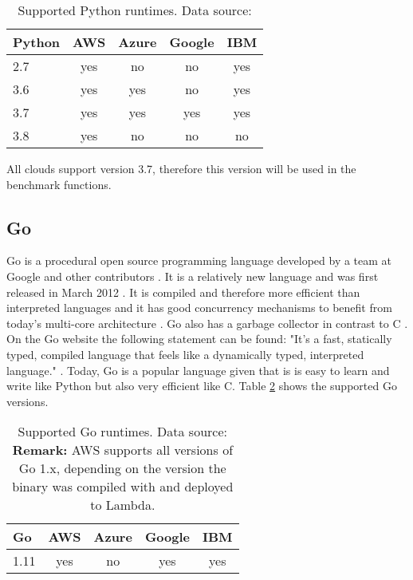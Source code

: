 \begin{table}[htp]
\centering
\captionsetup[table]{justification=centering, labelfont=bf}
\begin{tabular}{|l|c|c|c|c|} 
 \hline
 Python & AWS & Azure & Google & IBM \\ \hline
2.7  & \cellcolor{green!25}yes    & \cellcolor{red!25}no    & \cellcolor{red!25}no  & \cellcolor{green!25}yes\\ \hline
3.6  & \cellcolor{green!25}yes & \cellcolor{green!25}yes & \cellcolor{red!25}no   & \cellcolor{green!25}yes \\ \hline
3.7 & \cellcolor{green!25}yes & \cellcolor{green!25}yes & \cellcolor{green!25}yes  & \cellcolor{green!25}yes \\ \hline
3.8 & \cellcolor{green!25}yes & \cellcolor{red!25}no & \cellcolor{red!25}no  & \cellcolor{red!25}no  \\ \hline
\end{tabular}
\caption[Supported Python runtimes]{Supported Python runtimes. Data source: \cite{AWSLambdaLanguages, AzureFunctionsLanguages, GoogleFunctionsLanguages, IBMRuntimes}}
\label{table:python}
\end{table}

All clouds support version 3.7, therefore this version will be used in the benchmark functions.

\subsection{Go}
Go is a procedural open source programming language developed by a team at Google and other contributors \cite{GoDoc, GoProject}. It is a relatively new language and was first released in March 2012 \cite{GoProject}. It is compiled and therefore more efficient than interpreted languages and it has good concurrency mechanisms to benefit from today's multi-core architecture \cite{GoDoc}. Go also has a garbage collector in contrast to C \cite{GoDoc}. On the Go website the following statement can be found: "It's a fast, statically typed, compiled language that feels like a dynamically typed, interpreted language." \cite{GoDoc}. Today, Go is a popular language given that is is easy to learn and write like Python but also very efficient like C. Table \ref{table:go} shows the supported Go versions.

\begin{table}[htp]
\centering
\captionsetup[table]{justification=centering, labelfont=bf}
\begin{tabular}{|l|c|c|c|c|} 
 \hline
 Go & AWS & Azure & Google & IBM \\ \hline
1.11  & \cellcolor{green!25}yes    & \cellcolor{red!25}no    & \cellcolor{green!25}yes  & \cellcolor{green!25}yes\\ \hline
\end{tabular}
\caption[Supported Go runtimes]{Supported Go runtimes. Data source: \cite{AWSLambdaLanguages, AzureFunctionsLanguages, GoogleFunctionsLanguages, IBMRuntimes}\\ \textbf{Remark:} AWS supports all versions of Go 1.x, depending on the version the binary was compiled with and deployed to Lambda.}
\label{table:go}
\end{table}

